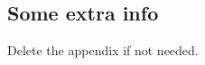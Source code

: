 \begin{singlecolumnsection}
\chapter{Some extra info}

Delete the appendix if not needed.

\end{singlecolumnsection}